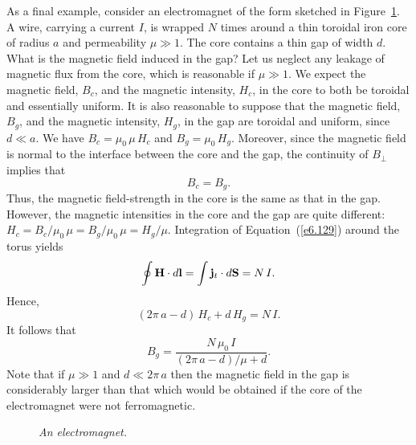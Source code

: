 As a final example, consider an electromagnet of the form sketched  in Figure~\ref{mc}. A wire, carrying a current $I$, is wrapped $N$ times
around a thin toroidal iron core of radius $a$ and permeability $\mu\gg 1$. The core contains
a thin gap of width $d$. What is the magnetic field induced in the
gap? 
Let us neglect any leakage of magnetic flux from the core, which is
reasonable if $\mu\gg 1$. We expect the magnetic field, $B_c$,
and the magnetic intensity, $H_c$, in the core to both be toroidal and essentially
uniform. It is also reasonable to suppose that the magnetic field, $B_g$, and the
magnetic intensity, $H_g$, in the gap are toroidal and uniform, since
$d\ll a$. We have $B_c = \mu_0\,\mu\,H_c$ and $B_g=\mu_0\,H_g$. 
Moreover, since the magnetic field is normal to the interface between the
core and the gap, the continuity of $B_\perp$ implies that
\begin{equation}
B_c = B_g.
\end{equation}
Thus, the magnetic field-strength in the core is the same as that in the
gap. However, the magnetic intensities in the core and the gap are
quite different: $H_c = B_c/\mu_0\,\mu = B_g/\mu_0\,\mu = H_g/\mu$.
Integration of Equation~(\ref{e6.129}) around the torus yields
\begin{equation}
\oint {\bf H}\cdot d{\bf l} = \int{\bf j}_t\cdot d{\bf S} = N\,I.
\end{equation}
Hence,
\begin{equation}
(2\pi\,a-d)\,H_c + d\,H_g = N\,I.
\end{equation}
It follows that
\begin{equation}
B_g = \frac{N\,\mu_0\,I}{(2\pi\,a-d)/\mu + d}.
\end{equation}
Note that if $\mu\gg 1$ and $d\ll 2\pi\,a$ then the magnetic field in the
gap is considerably larger than that which would be obtained if the
core of the electromagnet were not ferromagnetic.
\begin{figure}
\centerline{}
\caption{\em An electromagnet.}\label{mc}
\end{figure}

